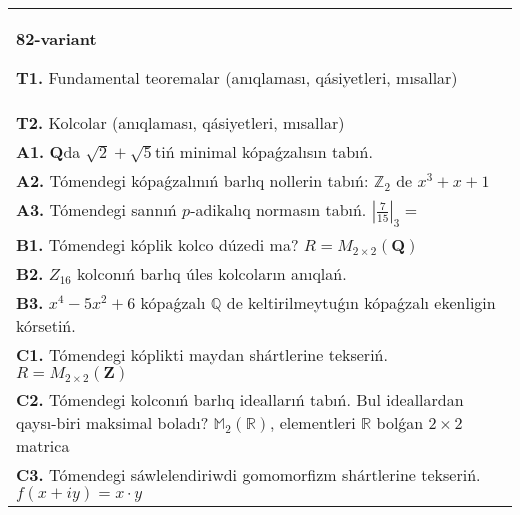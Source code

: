 \documentclass{article}
\begin{document}
\begin{tabular}{m{17cm}}
\textbf{82-variant}
\newline

\textbf{T1.} Fundamental teoremalar (anıqlaması, qásiyetleri, mısallar) \\
\textbf{T2.} Kolcolar (anıqlaması, qásiyetleri, mısallar) \\
\textbf{A1.} \(\mathbf{Q}\)da \(\sqrt{2} + \sqrt{5}\)tiń minimal kópaǵzalısın tabıń. \\
\textbf{A2.} Tómendegi kópaǵzalınıń barlıq nollerin tabıń: \(\mathbb{Z}_{2}\) de \(x^{3} + x + 1\) \\
\textbf{A3.} Tómendegi sannıń \(p\)-adikalıq normasın tabıń. \(|\frac{7}{15}|_{3} =\) \\
\textbf{B1.} Tómendegi kóplik kolco dúzedi ma? \(R = M_{2 \times 2}\left( \mathbf{Q} \right)\) \\
\textbf{B2.} \(Z_{16}\) kolconıń barlıq úles kolcoların anıqlań. \\
\textbf{B3.} \(x^{4} - 5x^{2} + 6\) kópaǵzalı \(\mathbb{Q}\) de keltirilmeytuǵın kópaǵzalı ekenligin kórsetiń. \\
\textbf{C1.} Tómendegi kóplikti maydan shártlerine tekseriń. \(R = M_{2 \times 2}\left( \mathbf{Z} \right)\) \\
\textbf{C2.} Tómendegi kolconıń barlıq ideallarıń tabıń. Bul ideallardan qaysı-biri maksimal boladı? \(\mathbb{M}_{2}\left( \mathbb{R} \right)\), elementleri \(\mathbb{R}\) bolǵan \(2 \times 2\) matrica \\
\textbf{C3.} Tómendegi sáwlelendiriwdi gomomorfizm shártlerine tekseriń. \(f(x + iy) = x \cdot y\) \\

\end{tabular}
\vspace{1cm}
\end{document}

